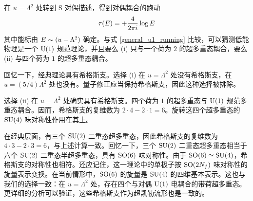 在 $u=\Lambda^2$ 处转到 S 对偶描述，得到对偶耦合的跑动
\begin{equation}
\tau(E)=+\frac{4}{2\pi i}\log E
\end{equation}
其中能标由 $E\sim(u-\Lambda^2)$ 确定。与式 \eqref{general_u1_running} 比较，可以猜测低能物理是一个 ${\mathrm{U}}(1)$ 规范理论，并且要么 (i) 只与一个荷为 $2$ 的超多重态耦合，要么 (ii) 与四个荷为 $1$ 的超多重态耦合。

回忆一下，经典理论具有希格斯支。选择 (i) 在 $u=\Lambda^2$ 处没有希格斯支，在 $u=(5/4)\Lambda^2$ 处也没有。量子修正应当保持希格斯支，因此这种选择被排除。

选择 (ii) 在 $u=\Lambda^2$ 处确实具有希格斯支。四个荷为 $1$ 的超多重态与 ${\mathrm{U}}(1)$ 规范多重态耦合。因而，希格斯支的复维数为 $2\cdot4-2\cdot1=6$。旋转这四个超多重态的 $\mathop{\mathrm{SU}}(4)$ 味对称性作用在其上。

在经典层面，有三个 $\mathop{\mathrm{SU}}(2)$ 二重态超多重态，因此希格斯支的复维数为 $4\cdot3-2\cdot3=6$，与上述计算一致。回忆一下，三个 $\mathop{\mathrm{SU}}(2)$ 二重态超多重态相当于六个 $\mathop{\mathrm{SU}}(2)$ 二重态半超多重态，具有 $\mathop{\mathrm{SO}}(6)$ 味对称性。由于 $\mathop{\mathrm{SO}}(6)\simeq\mathop{\mathrm{SU}}(4)$，希格斯支的对称性也相符。还应记住，这一理论中的单极子按 $\mathop{\mathrm{SO}}(2N_f)$ 味对称性的旋量表示变换。在当前情形中，$\mathop{\mathrm{SO}}(6)$ 的旋量是 $\mathop{\mathrm{SU}}(4)$ 的四维基本表示。这也与我们的选择一致：在 $u=\Lambda^2$ 处，存在四个与对偶 ${\mathrm{U}}(1)$ 电耦合的带荷超多重态。更详细的分析可以验证，这些希格斯支作为超凯勒流形也是一致的。
